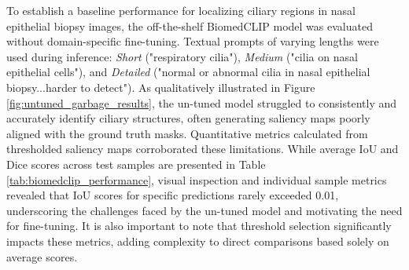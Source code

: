 \documentclass[./dissertation.tex]{subfiles}
\begin{document}









To establish a baseline performance for localizing ciliary regions in nasal epithelial biopsy images, the off-the-shelf BiomedCLIP model was evaluated without domain-specific fine-tuning. Textual prompts of varying lengths were used during inference: \textit{Short} ("respiratory cilia"), \textit{Medium} ("cilia on nasal epithelial cells"), and \textit{Detailed} ("normal or abnormal cilia in nasal epithelial biopsy...harder to detect"). As qualitatively illustrated in Figure \ref{fig:untuned_garbage_results}, the un-tuned model struggled to consistently and accurately identify ciliary structures, often generating saliency maps poorly aligned with the ground truth masks. Quantitative metrics calculated from thresholded saliency maps corroborated these limitations. While average IoU and Dice scores across test samples are presented in Table \ref{tab:biomedclip_performance}, visual inspection and individual sample metrics revealed that IoU scores for specific predictions rarely exceeded 0.01, underscoring the challenges faced by the un-tuned model and motivating the need for fine-tuning. It is also important to note that threshold selection significantly impacts these metrics, adding complexity to direct comparisons based solely on average scores.
\end{document}
